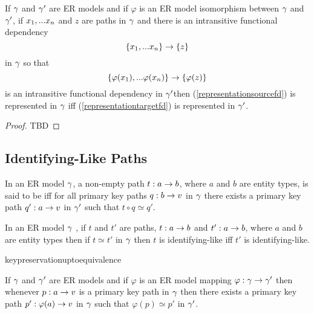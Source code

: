 \begin{lemma}
If $\gamma$ and $\gamma'$ are ER models and  if  $\varphi$ is an ER model isomorphism between $\gamma$  and $\gamma'$,  if $x_1,...x_n$ and $z$ are paths in $\gamma$
and there is an  intransitive functional dependency
\begin{equation}
\label{representationsourcefd}
\left\{x_1,...x_n\right\} \rightarrow \left\{z\right\}
\end{equation} 
in $\gamma$
so that
\begin{equation}
\label{representationtargetfd}
\left\{\varphi(x_1),...\varphi(x_n)\right\} \rightarrow \left\{\varphi(z)\right\}
\end{equation}
is an intransitive  functional dependency in $\gamma'$then
(\ref{representationsourcefd}) is represented in $\gamma$ iff
(\ref{representationtargetfd}) is represented in $\gamma'$.
\end{lemma}
\begin{proof}
TBD
\end{proof}

\subsection{Identifying-Like Paths}

\begin{definition}
In an ER model $\gamma$, a non-empty path $t: a \rightarrow b$, where $a$ and $b$ are entity types, is said to be  iff  for all primary key paths $q:b \rightarrow v$ in $\gamma$ there exists a primary key path $q':a \rightarrow v$ in $\gamma'$ such that $t \circ q \simeq q'$.
\end{definition}

\begin{lemma}
In an ER model $\gamma$ , if $t$ and $t'$ are paths, $t:a \rightarrow b$ and $t':a \rightarrow b$, where $a$ and $b$ are entity types
then if $t \simeq t'$ in $\gamma$ then $t$ is identifying-like iff $t'$ is identifying-like.
\end{lemma}

keypreservationuptoequivalence
\begin{observation}
If $\gamma$ and $\gamma'$ are ER models and if $\varphi$ is an ER model mapping $\varphi: \gamma \rightarrow \gamma'$ then whenever 
$p:a \rightarrow v$ is a primary key path in $\gamma$ then there exists a primary key path 
$p':\varphi(a) \rightarrow v$ in $\gamma$ such that $\varphi(p) \simeq p'$ in $\gamma'$.
\end{observation}

